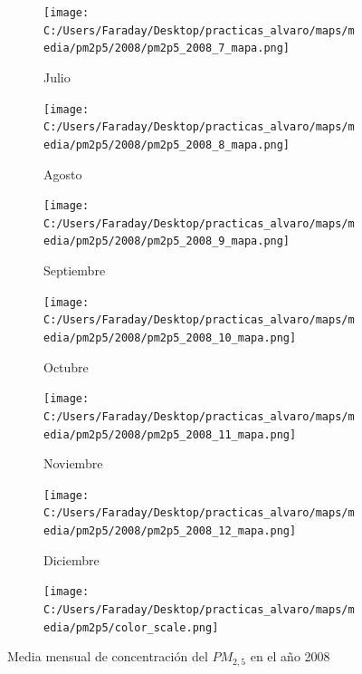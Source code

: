 \documentclass[12pt]{article}
\begin{document}
\begin{figure}[H]
\begin{subfigure}[H]{0.15\textwidth}
\texttt{[image: C:/Users/Faraday/Desktop/practicas\_alvaro/maps/media/pm2p5/2008/pm2p5\_2008\_7\_mapa.png]}
\captionsetup{labelformat=empty}
\caption{Julio}
\label{fig:map-pm2p5-2008-7}
\end{subfigure}
%
\begin{subfigure}[H]{0.15\textwidth}
\texttt{[image: C:/Users/Faraday/Desktop/practicas\_alvaro/maps/media/pm2p5/2008/pm2p5\_2008\_8\_mapa.png]}
\captionsetup{labelformat=empty}
\caption{Agosto}
\label{fig:map-pm2p5-2008-8}
\end{subfigure}
%
\begin{subfigure}[H]{0.15\textwidth}
\texttt{[image: C:/Users/Faraday/Desktop/practicas\_alvaro/maps/media/pm2p5/2008/pm2p5\_2008\_9\_mapa.png]}
\captionsetup{labelformat=empty}
\caption{Septiembre}
\label{fig:map-pm2p5-2008-9}
\end{subfigure}
%
\begin{subfigure}[H]{0.15\textwidth}
\texttt{[image: C:/Users/Faraday/Desktop/practicas\_alvaro/maps/media/pm2p5/2008/pm2p5\_2008\_10\_mapa.png]}
\captionsetup{labelformat=empty}
\caption{Octubre}
\label{fig:map-pm2p5-2008-10}
\end{subfigure}
%
\begin{subfigure}[H]{0.15\textwidth}
\texttt{[image: C:/Users/Faraday/Desktop/practicas\_alvaro/maps/media/pm2p5/2008/pm2p5\_2008\_11\_mapa.png]}
\captionsetup{labelformat=empty}
\caption{Noviembre}
\label{fig:map-pm2p5-2008-11}
\end{subfigure}
%
\begin{subfigure}[H]{0.15\textwidth}
\texttt{[image: C:/Users/Faraday/Desktop/practicas\_alvaro/maps/media/pm2p5/2008/pm2p5\_2008\_12\_mapa.png]}
\captionsetup{labelformat=empty}
\caption{Diciembre}
\label{fig:map-pm2p5-2008-12}
\end{subfigure}

\begin{subfigure}[H]{0.45\textwidth}
\texttt{[image: C:/Users/Faraday/Desktop/practicas\_alvaro/maps/media/pm2p5/color\_scale.png]}
\captionsetup{labelformat=empty}
\caption{}
\end{subfigure}

\vspace*{-7mm}
\caption{Media mensual de concentración del $PM_{2,5}$ en el año 2008}
\label{fig:map-pm2p5-2008}
\end{figure}
\end{document}
